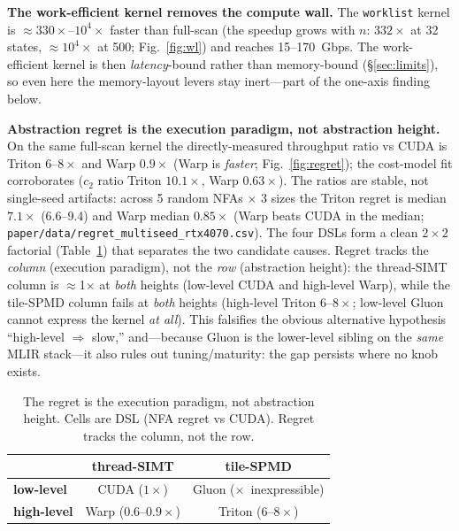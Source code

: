 \documentclass[conference]{IEEEtran}
\newcommand{\xmark}{$\times$}
\begin{document}
\textbf{The work-efficient kernel removes the compute wall.} The \texttt{worklist} kernel is
$\approx\!330\times$--$10^4\times$ faster than full-scan (the speedup grows with $n$: $332\times$
at 32 states, $\approx\!10^4\times$ at 500; Fig.~\ref{fig:wl}) and reaches 15--170~Gbps. The
work-efficient kernel is then \emph{latency}-bound rather than memory-bound (\S\ref{sec:limits}),
so even here the memory-layout levers stay inert---part of the one-axis finding below.

\textbf{Abstraction regret is the execution paradigm, not abstraction height.} On the same
full-scan kernel the directly-measured throughput ratio vs CUDA is Triton $6$--$8\times$ and
Warp $0.9\times$ (Warp is \emph{faster}; Fig.~\ref{fig:regret}); the cost-model fit corroborates
($c_2$ ratio Triton $10.1\times$, Warp $0.63\times$). The ratios are stable, not single-seed
artifacts: across 5 random NFAs $\times$ 3 sizes the Triton regret is median $7.1\times$
(6.6--9.4) and Warp median $0.85\times$ (Warp beats CUDA in the median;
\texttt{paper/data/regret\_multiseed\_rtx4070.csv}). The four DSLs form a clean $2\times2$
factorial (Table~\ref{tab:twobytwo}) that separates the two candidate causes. Regret tracks the
\emph{column} (execution paradigm), not the \emph{row} (abstraction height): the thread-SIMT
column is $\approx$1$\times$ at \emph{both} heights (low-level CUDA and high-level Warp), while
the tile-SPMD column fails at \emph{both} heights (high-level Triton $6$--$8\times$; low-level
Gluon cannot express the kernel \emph{at all}). This falsifies the obvious alternative
hypothesis ``high-level $\Rightarrow$ slow,'' and---because Gluon is the lower-level sibling on
the \emph{same} MLIR stack---it also rules out tuning/maturity: the gap persists where no knob
exists.

\begin{table}[t]
\centering
\caption{The regret is the execution paradigm, not abstraction height. Cells are
DSL (NFA regret vs CUDA). Regret tracks the column, not the row.}
\label{tab:twobytwo}
\small
\begin{tabular}{lcc}
\toprule
 & \textbf{thread-SIMT} & \textbf{tile-SPMD} \\
\midrule
\textbf{low-level}  & CUDA ($1\times$)        & Gluon (\xmark\ inexpressible) \\
\textbf{high-level} & Warp ($0.6$--$0.9\times$) & Triton ($6$--$8\times$) \\
\bottomrule
\end{tabular}
\end{table}
\end{document}
